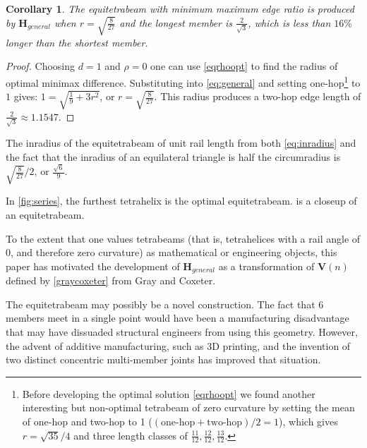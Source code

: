 \documentclass[10pt,final]{journals-1.0/asme2ej}
\newtheorem{corollary}{Corollary}
\renewcommand{\vec}[1]{\mathbf{#1}}
\begin{document}
\begin{corollary}
  The equitetrabeam with minimum maximum edge ratio is produced
  \newline by $\vec{H}_{general}$ when $ r = \sqrt{\frac{8}{27}} $ and the longest member is $\frac{2}{\sqrt{3}}$,
  which is less than $16\%$ longer
  than the shortest member.
\end{corollary}

\begin{proof}
Choosing $d = 1$ and $\rho = 0$ one can use \cref{eqrhoopt} to find the radius of 
optimal minimax difference. Substituting into  \cref{eq:general} and setting one-hop\footnote{Before developing
  the optimal solution  \cref{eqrhoopt} we found another interesting but non-optimal tetrabeam of zero curvature
by setting
the mean of one-hop and two-hop to 1 ($(\text{one-hop} + \text{two-hop})/2 = 1$),
  which gives $r = \sqrt{35}/4$ and
  three length classes of $\frac{11}{12}, \frac{12}{12}, \frac{13}{12}$.}
 to $1$
gives:
$ 1  =  \sqrt{\frac{1}{9} + 3r^2} $, or $ r  = \sqrt{\frac{8}{27}}$. This radius
produces a two-hop edge length of $\frac{2}{\sqrt{3}} \approx 1.1547$.
\end{proof}


The inradius of the equitetrabeam of unit
rail length from both  \cref{eq:inradius} and the fact that the inradius of
an equilateral triangle is half the circumradius is $\sqrt{\frac{8}{27}}/2$, or $\frac{\sqrt{6}}{9}$.


In \cref{fig:series}, the furthest tetrahelix is the optimal equitetrabeam.
 is a closeup of an equitetrabeam.

To the extent that one values tetrabeams (that is, tetrahelices with a rail angle of $0$,
and therefore zero curvature) as mathematical or engineering objects,
this paper has motivated the development of $\vec{H}_{general}$ as a transformation of $\vec{V}(n)$ defined by
\cref{graycoxeter} from Gray and Coxeter.


The equitetrabeam may possibly be a novel construction.
The fact that 6 members meet in a single point would have been a manufacturing disadvantage that
may have dissuaded structural engineers from using this geometry.
However, the advent of additive manufacturing, such as 3D printing, and the invention of two
distinct concentric multi-member joints\cite{song2003spherical,HamlinSandersonCMS} has improved that situation.
\end{document}
